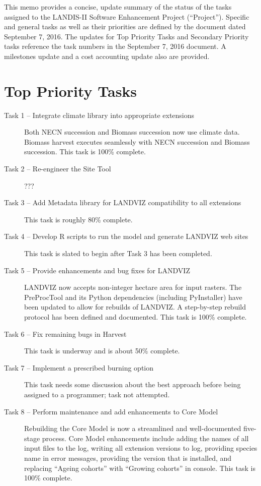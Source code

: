 \documentclass[letterpaper,11pt]{texMemo}
\begin{document}
\maketitle
This memo provides a concise, update summary of the status of the tasks assigned to the LANDIS-II Software Enhancement Project (\enquote{Project}). Specific and general tasks as well as their priorities are defined by the document dated September 7, 2016.  The updates for Top Priority Tasks and Secondary Priority tasks reference the task numbers in the September 7, 2016 document. A milestones update and a cost accounting update also are provided.\\

\section*{Top Priority Tasks}
\begin{description}
  \item[Task 1 -- Integrate climate library into appropriate extensions] Both NECN succession and Biomass succession now use climate data. Biomass harvest executes seamlessly with NECN succession and Biomass succession. This task is 100\% complete.
  \item[Task 2 -- Re-engineer the Site Tool] ???
  \item[Task 3 -- Add Metadata library for LANDVIZ compatibility to all extensions] This task is roughly 80\% complete.
  \item[Task 4 -- Develop R scripts to run the model and generate LANDVIZ web sites] This task is slated to begin after Task 3 has been completed.
  \item[Task 5 -- Provide enhancements and bug fixes for LANDVIZ] LANDVIZ now accepts non-integer hectare area for input rasters. The PreProcTool and its Python dependencies (including PyInstaller) have been updated to allow for rebuilds of LANDVIZ. A step-by-step rebuild protocol has been defined and documented. This task is 100\% complete.
  \item[Task 6 -- Fix remaining bugs in Harvest] This task is underway and is about 50\% complete.
  \item[Task 7 -- Implement a prescribed burning option] This task needs some discussion about the best approach before being assigned to a programmer; task not attempted.
  \item[Task 8 -- Perform maintenance and add enhancements to Core Model] Rebuilding the Core Model is now a streamlined and well-documented five-stage process. Core Model enhancements include adding the names of all input files to the log, writing all extension versions to log, providing species name in error messages, providing the version that is installed, and replacing “Ageing cohorts” with “Growing cohorts” in console. This task is 100\% complete.
\end{description}
\end{document}
